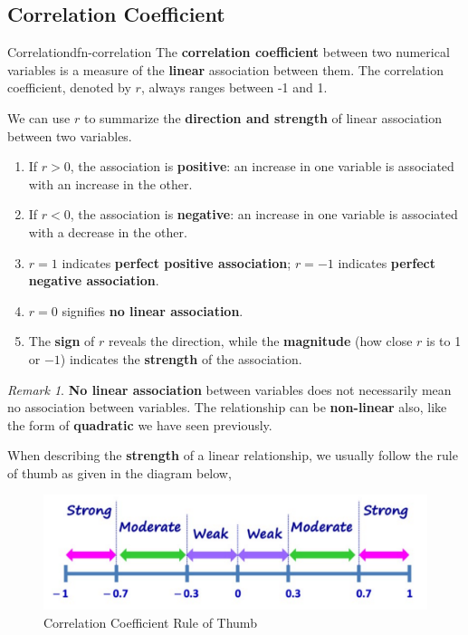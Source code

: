 \documentclass[math,code]{amznotes}
\theoremstyle{remark}
\newtheorem*{remark}{Remark}
\begin{document}
\subsection{Correlation Coefficient}
\begin{dfnbox}{Correlation}{dfn-correlation}
    The {\color{red} \textbf{correlation coefficient}} between two numerical variables is a measure of the \textbf{linear} association between them. The correlation coefficient, denoted by $r$, always ranges between -1 and 1. 
\end{dfnbox}
We can use $r$ to summarize the \textbf{direction and strength} of linear association between two variables.
\begin{enumerate}
    \item If \(r > 0\), the association is \textbf{positive}: an increase in one variable is associated with an increase in the other.
    \item If \(r < 0\), the association is \textbf{negative}: an increase in one variable is associated with a decrease in the other.
    \item \(r = 1\) indicates \textbf{perfect positive association}; \(r = -1\) indicates \textbf{perfect negative association}.
    \item \(r = 0\) signifies \textbf{no linear association}.
    \item The \textbf{sign} of \(r\) reveals the direction, while the \textbf{magnitude} (how close \(r\) is to 1 or \(-1\)) indicates the \textbf{strength} of the association.
\end{enumerate}
\begin{notebox}
    \begin{remark}
        \textbf{No linear association} between variables does not necessarily mean no association between variables. The relationship can be \textbf{non-linear} also, like the form of \textbf{quadratic} we have seen previously.
    \end{remark}
\end{notebox}
When describing the \textbf{strength} of a linear relationship, we usually follow the rule of thumb as given in the diagram below,
\begin{figure}[H]
    \centering
    \includegraphics[width=0.75\linewidth]{images/chapter3-correlation-coefficient-rule-of-thumb.png}
    \caption{Correlation Coefficient Rule of Thumb}
    \label{fig:chapter3-correlation-coefficient-rule-of-thumb}
\end{figure}
\end{document}
